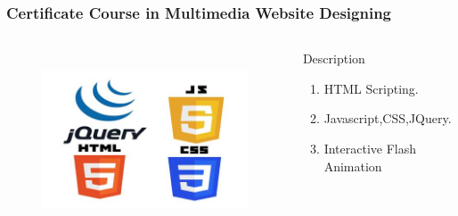 \begin{frame}
	\frametitle{ {\large Certificate Course in Multimedia Website Designing}}
	\begin{columns}
	
	\begin{figure}
		\includegraphics[width=200pt,height=150pt]{figures/course_mwd.jpg}
	\end{figure}
	
	
	\begin{block}{Description}
		
		\begin{enumerate}
			\item HTML Scripting. 
			\item Javascript,CSS,JQuery.
			\item Interactive Flash Animation
		\end{enumerate}
		
	\end{block}
	
\end{columns}
\end{frame}